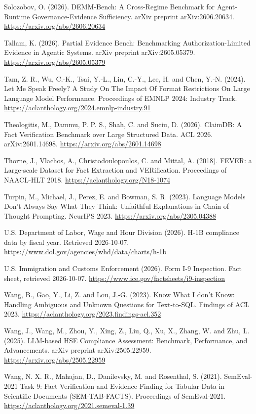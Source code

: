 \documentclass[10pt,twocolumn]{article}
\begin{document}
Solozobov, O. (2026). DEMM-Bench: A Cross-Regime Benchmark for Agent-Runtime Governance-Evidence Sufficiency. arXiv preprint arXiv:2606.20634. \url{https://arxiv.org/abs/2606.20634}

Tallam, K. (2026). Partial Evidence Bench: Benchmarking Authorization-Limited Evidence in Agentic Systems. arXiv preprint arXiv:2605.05379. \url{https://arxiv.org/abs/2605.05379}

Tam, Z. R., Wu, C.-K., Tsai, Y.-L., Lin, C.-Y., Lee, H. and Chen, Y.-N. (2024). Let Me Speak Freely? A Study On The Impact Of Format Restrictions On Large Language Model Performance. Proceedings of EMNLP 2024: Industry Track. \url{https://aclanthology.org/2024.emnlp-industry.91}

Theologitis, M., Dammu, P. P. S., Shah, C. and Suciu, D. (2026). ClaimDB: A Fact Verification Benchmark over Large Structured Data. ACL 2026. arXiv:2601.14698. \url{https://arxiv.org/abs/2601.14698}

Thorne, J., Vlachos, A., Christodoulopoulos, C. and Mittal, A. (2018). FEVER: a Large-scale Dataset for Fact Extraction and VERification. Proceedings of NAACL-HLT 2018. \url{https://aclanthology.org/N18-1074}

Turpin, M., Michael, J., Perez, E. and Bowman, S. R. (2023). Language Models Don't Always Say What They Think: Unfaithful Explanations in Chain-of-Thought Prompting. NeurIPS 2023. \url{https://arxiv.org/abs/2305.04388}

U.S. Department of Labor, Wage and Hour Division (2026). H-1B compliance data by fiscal year. Retrieved 2026-10-07. \url{https://www.dol.gov/agencies/whd/data/charts/h-1b}

U.S. Immigration and Customs Enforcement (2026). Form I-9 Inspection. Fact sheet, retrieved 2026-10-07. \url{https://www.ice.gov/factsheets/i9-inspection}

Wang, B., Gao, Y., Li, Z. and Lou, J.-G. (2023). Know What I don't Know: Handling Ambiguous and Unknown Questions for Text-to-SQL. Findings of ACL 2023. \url{https://aclanthology.org/2023.findings-acl.352}

Wang, J., Wang, M., Zhou, Y., Xing, Z., Liu, Q., Xu, X., Zhang, W. and Zhu, L. (2025). LLM-based HSE Compliance Assessment: Benchmark, Performance, and Advancements. arXiv preprint arXiv:2505.22959. \url{https://arxiv.org/abs/2505.22959}

Wang, N. X. R., Mahajan, D., Danilevsky, M. and Rosenthal, S. (2021). SemEval-2021 Task 9: Fact Verification and Evidence Finding for Tabular Data in Scientific Documents (SEM-TAB-FACTS). Proceedings of SemEval-2021. \url{https://aclanthology.org/2021.semeval-1.39}
\end{document}
